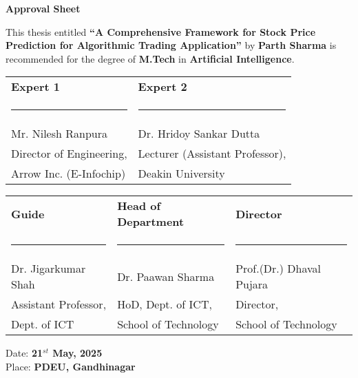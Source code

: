 \begin{center}
\textbf{\large Approval Sheet}
\end{center}

This thesis entitled \textbf{\enquote{A Comprehensive Framework for Stock Price Prediction for Algorithmic Trading Application}} by \textbf{Parth Sharma} is recommended for the degree of \textbf{M.Tech} in \textbf{Artificial Intelligence}.

\vspace{1cm}
\begin{table}[h!]
    \centering
    \begin{tabular}{@{}m{}<{\centering} m{}<{\centering}@{}}
    \textbf{Expert 1} & \textbf{Expert 2} \\[2.5em]
    \rule{0.35\textwidth}{0.4pt} & \rule{0.35\textwidth}{0.4pt} \\[0.5em]
    Mr. Nilesh Ranpura & Dr. Hridoy Sankar Dutta \\[0.5em]
    Director of Engineering, & Lecturer (Assistant Professor), \\[0.5em]
    Arrow Inc. (E-Infochip) & Deakin University \\[3em]
    \end{tabular}
\end{table}

\begin{table}[h!]
    \centering
    \begin{tabular}{@{}m{}<{\centering} m{}<{\centering} m{}<{\centering}@{}}
    \textbf{Guide} & \textbf{Head of Department} & \textbf{Director} \\[2.5em]
    \rule{0.25\textwidth}{0.4pt} & \rule{0.25\textwidth}{0.4pt} & \rule{0.25\textwidth}{0.4pt} \\[0.5em]
    Dr. Jigarkumar Shah & Dr. Paawan Sharma & Prof.(Dr.) Dhaval Pujara \\[0.5em]
    Assistant Professor, & HoD, Dept. of ICT, & Director, \\[0.5em]
    Dept. of ICT & School of Technology & School of Technology \\
    \end{tabular}
\end{table}

\vfill
\begin{flushleft}
    Date: \textbf{21$^{st}$ May, 2025}\\
    Place: \textbf{PDEU, Gandhinagar}\\    
\end{flushleft}